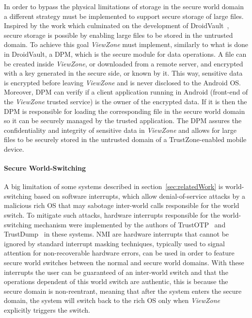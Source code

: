 In order to bypass the physical limitations of storage in the secure world domain a different strategy must be implemented to support secure storage of large files. Inspired by the work which culminated on the development of DroidVault~\cite{li2014droidvault}, secure storage is possible by enabling large files to be stored in the untrusted domain. To achieve this goal \emph{ViewZone} must implement, similarly to what is done in DroidVault, a \ac{DPM}, which is the secure module for data operations. A file can be created inside \emph{ViewZone}, or downloaded from a remote server, and encrypted with a key generated in the secure side, or known by it. This way, sensitive data is encrypted before leaving \emph{ViewZone} and is never disclosed to the Android OS. Moreover, \ac{DPM} can verify if a client application running in Android (front-end of the \emph{ViewZone} trusted service) is the owner of the encrypted data. If it is then the \ac{DPM} is responsible for loading the corresponding file in the secure world domain so it can be securely managed by the trusted application. The \ac{DPM} assures the confidentiality and integrity of sensitive data in \emph{ViewZone} and allows for large files to be securely stored in the untrusted domain of a TrustZone-enabled mobile device.

\paragraph{\textbf{Secure World-Switching}}

A big limitation of some systems described in section~\ref{sec:relatedWork} is world-switching based on software interrupts, which allow denial-of-service attacks by a malicious rich OS that may sabotage inter-world calls responsible for the world switch. To mitigate such attacks, hardware interrupts responsible for the world-switching mechanism were implemented by the authors of TrustOTP~\cite{sun2015trustotp} and TrustDump~\cite{sun2015reliable} in these systems. \ac{NMI} are hardware interrupts that cannot be ignored by standard interrupt masking techniques, typically used to signal attention for non-recoverable hardware errors, can be used in order to feature secure world switches between the normal and secure world domains. With these interrupts the user can be guaranteed of an inter-world switch and that the operations dependent of this world switch are authentic, this is because the secure domain is non-reentrant, meaning that after the system enters the secure domain, the system will switch back to the rich OS only when \emph{ViewZone} explicitly triggers the switch.

